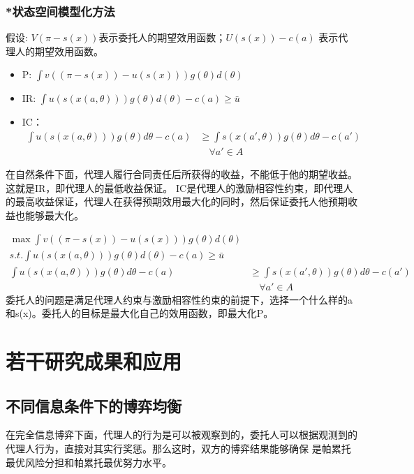 \documentclass[12pt, a4paper]{article} %
\begin{document}
\begin{CJK*}{UTF8}{gbsn}
            \subsubsection{*状态空间模型化方法}
            假设: $V(\pi-s(x))$表示委托人的期望效用函数；$U(s(x))-c(a)$ 表示代理人的期望效用函数。\par
            \begin{itemize}
                \item[] P: $\int v((\pi-s(x)) - u(s(x)))g(\theta)d(\theta)$
                \item[] IR: $\int u(s(x(a,\theta)))g(\theta)d(\theta) - c(a) \geq \bar{u}$
                \item[] IC：
                \begin{align*}
                    \int u(s(x(a,\theta)))g(\theta)d\theta - c(a) &\geq \int s(x(a',\theta))g(\theta)d\theta-c(a')\\
                     &\quad \forall a' \in A
                    \end{align*}
            \end{itemize}
            在自然条件下面，代理人履行合同责任后所获得的收益，不能低于他的期望收益。这就是IR，即代理人的最低收益保证。
            IC是代理人的激励相容性约束，即代理人的最高收益保证，代理人在获得预期效用最大化的同时，然后保证委托人他预期收益也能够最大化。\par
            \begin{align*}
                \max \int v((\pi-s(x)) - u(s(x)))g(\theta)d(\theta)\\
                s.t. \int u(s(x(a,\theta)))g(\theta)d(\theta) - c(a) \geq \bar{u}\\
                \int u(s(x(a,\theta)))g(\theta)d\theta - c(a) &\geq \int s(x(a',\theta))g(\theta)d\theta-c(a')\\
                &\quad \forall a' \in A
                \end{align*}
                委托人的问题是满足代理人约束与激励相容性约束的前提下，选择一个什么样的a和s(x)。委托人的目标是最大化自己的效用函数，即最大化P。

            \clearpage
            \section{若干研究成果和应用}
            \subsection{不同信息条件下的博弈均衡}
            在完全信息博弈下面，代理人的行为是可以被观察到的，委托人可以根据观测到的代理人行为，直接对其实行奖惩。那么这时，双方的博弈结果能够确保
            是帕累托最优风险分担和帕累托最优努力水平。\par


\end{CJK*}
\end{document}
